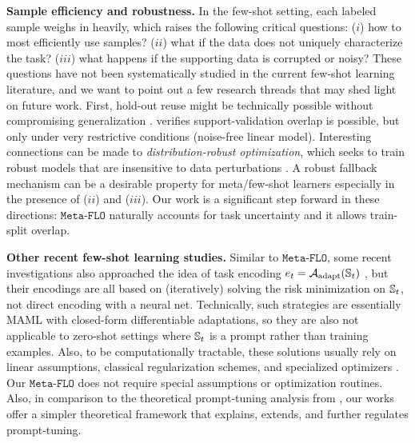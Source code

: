 \documentclass[nohyperref]{article}
\theoremstyle{plain}
\theoremstyle{definition}
\theoremstyle{remark}
\newcommand{\CA}{\mathcal{A}}
\newcommand{\adapt}{\text{adapt}}
\newcommand{\metaflo}{\texttt{Meta-FLO} }
\begin{document}
{\bf Sample efficiency and robustness.} In the few-shot setting, each labeled sample weighs in heavily, which raises the following critical questions: ($i$) how to most efficiently use samples? ($ii$) what if the data does not uniquely characterize the task? ($iii$) what happens if the supporting data is corrupted or noisy? These questions have not been systematically studied in the current few-shot learning literature, and we want to point out a few research threads that may shed light on future work. First, hold-out reuse might be technically possible without compromising generalization \citep{dwork2015generalization, dwork2015reusable}. \citet{bai2021important} verifies support-validation overlap is possible, but only under very restrictive conditions (noise-free linear model). Interesting connections can be made to {\it distribution-robust optimization}, which seeks to train robust models that are insensitive to data perturbations \citep{sinha2018certifying, staib2019distributionally, husain2020distributional}. A robust fallback mechanism can be a desirable property for meta/few-shot learners especially in the presence of ($ii$) and ($iii$). Our work is a significant step forward in these directions: $\metaflo$ naturally accounts for task uncertainty and it allows train-split overlap. 


{\bf Other recent few-shot learning studies.} Similar to $\metaflo$, some recent investigations also approached the idea of task encoding $e_t = \CA_{\adapt}(\BS_t)$ \citep{bertinetto2019meta}, but their encodings are all based on (iteratively) solving the risk minimization on $\mathbb{S}_t$, not direct encoding with a neural net. Technically, such strategies are essentially MAML with closed-form differentiable adaptations, so they are also not applicable to zero-shot settings where $\mathbb{S}_t$ is a prompt rather than training examples. Also, to be computationally tractable, these solutions usually rely on linear assumptions, classical regularization schemes, and specialized optimizers \citep{lee2019meta, ziko2020laplacian}. Our $\metaflo$ does not require special assumptions or optimization routines. Also, in comparison to the theoretical prompt-tuning analysis from \citet{wei2021pretrained}, our works offer a simpler theoretical framework that explains, extends, and further regulates prompt-tuning. 
\end{document}
